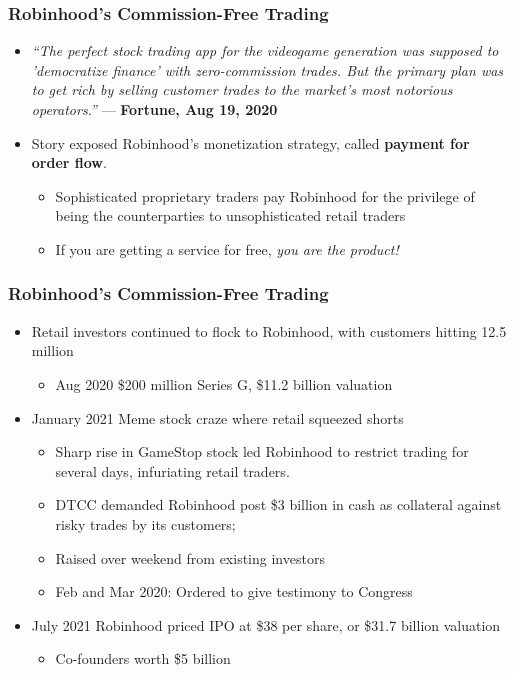 \documentclass[aspectratio=169]{beamer}
\begin{document}
\begin{frame}
\frametitle{Robinhood’s Commission-Free Trading}


\vspace{-2mm}
\begin{itemize}
    \item \textit{“The perfect stock trading app for the videogame generation was supposed to 'democratize finance' with zero-commission trades. But the primary plan was to get rich by selling customer trades to the market’s most notorious operators.”} — \textbf{Fortune, Aug 19, 2020}
    \item Story exposed Robinhood’s monetization strategy, called \textbf{payment for order flow}.
    \begin{itemize}
        \item Sophisticated proprietary traders pay Robinhood for the privilege of being the counterparties to unsophisticated retail traders 
        \item If you are getting a service for free, \emph{you are the product!}
    \end{itemize}
\end{itemize}


\end{frame} 



\begin{frame}
\frametitle{Robinhood’s Commission-Free Trading}




\vspace{-2mm}
\begin{itemize}
    \item Retail investors continued to flock to Robinhood, with customers hitting 12.5 million
    \begin{itemize}
        \item Aug 2020 \$200 million Series G, \$11.2 billion valuation
    \end{itemize}
    \item January 2021 Meme stock craze where retail squeezed shorts
    \begin{itemize}
        \item Sharp rise in GameStop stock led Robinhood to restrict trading for several days, infuriating retail traders.
        \item DTCC demanded Robinhood post \$3 billion in cash as collateral against risky trades by its customers;
        \item Raised over weekend from existing investors
        \item Feb and Mar 2020: Ordered to give testimony to Congress
    \end{itemize}
    \item July 2021 Robinhood priced IPO at \$38 per share, or \$31.7 billion valuation
    \begin{itemize}
        \item Co-founders worth \$5 billion
    \end{itemize}
\end{itemize}


\end{frame} 
\end{document}
